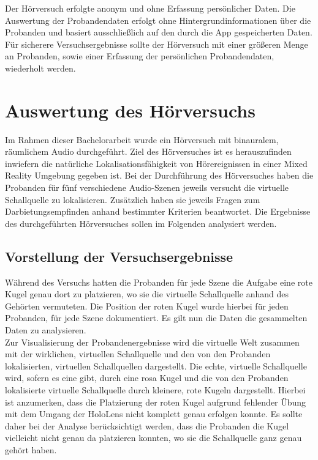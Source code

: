  Der Hörversuch erfolgte anonym und ohne Erfassung persönlicher Daten. Die Auswertung der Probandendaten erfolgt ohne Hintergrundinformationen über die Probanden und basiert ausschließlich auf den durch die App gespeicherten Daten. Für sicherere Versuchsergebnisse sollte der Hörversuch mit einer größeren Menge an Probanden, sowie einer Erfassung der persönlichen Probandendaten, wiederholt werden.
 
 \chapter{Auswertung des Hörversuchs}
 Im Rahmen dieser Bachelorarbeit wurde ein Hörversuch mit binauralem, räumlichem Audio durchgeführt. Ziel des Hörversuches ist es herauszufinden inwiefern die natürliche Lokalisationsfähigkeit von Hörereignissen in einer Mixed Reality Umgebung gegeben ist. Bei der Durchführung des Hörversuches haben die Probanden für fünf verschiedene Audio-Szenen jeweils versucht die virtuelle Schallquelle zu lokalisieren.  Zusätzlich haben sie jeweils Fragen zum Darbietungsempfinden anhand bestimmter Kriterien beantwortet.  Die Ergebnisse des durchgeführten Hörversuches sollen im Folgenden analysiert werden.
 
 \section{Vorstellung der Versuchsergebnisse}
 Während des Versuchs hatten die Probanden für jede Szene die Aufgabe eine rote Kugel genau dort zu platzieren, wo sie die virtuelle Schallquelle anhand des Gehörten vermuteten. Die Position der roten Kugel wurde hierbei für jeden Probanden, für jede Szene dokumentiert. Es gilt nun die Daten die gesammelten Daten zu analysieren. \\
 
 Zur Visualisierung der Probandenergebnisse wird die virtuelle Welt zusammen mit der wirklichen, virtuellen Schallquelle und den von den Probanden lokalisierten, virtuellen Schallquellen dargestellt. Die echte, virtuelle Schallquelle wird, sofern es eine gibt, durch eine rosa Kugel und die von den Probanden lokalisierte virtuelle Schallquelle durch  kleinere, rote Kugeln dargestellt. Hierbei ist anzumerken, dass die Platzierung der roten Kugel aufgrund fehlender Übung mit dem Umgang der HoloLens nicht komplett genau erfolgen konnte. Es sollte daher bei der Analyse berücksichtigt werden, dass die Probanden die Kugel vielleicht nicht genau da platzieren konnten, wo sie die Schallquelle ganz genau gehört haben. 
 
